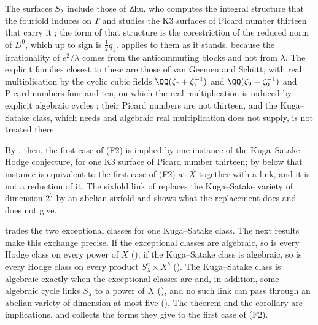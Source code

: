 \begin{remark}
The surfaces $S_{\lambda}$ include those of Zhu, who computes the integral
structure that the fourfold induces on $T$ and studies the K3 surfaces of
Picard number thirteen that carry it \cite{Zhu18}; the form of that structure
is the corestriction of the reduced norm of $D^{0}$, which up to sign is
$\frac12q_{1}$.  applies to them as it stands, because the
irrationality of $e^{2}/\lambda$ comes from the anticommuting blocks and not
from $\lambda$. The explicit families closest to these are those of van
Geemen and Sch\"utt, with
real multiplication by the cyclic cubic fields $\QQ(\zeta_{7}+\zeta_{7}^{-1})$
and $\QQ(\zeta_{9}+\zeta_{9}^{-1})$ and Picard numbers four and ten, on which
the real multiplication is induced by explicit algebraic cycles
\cite[Theorem~1.2 and Section~4.8]{vGS25}; their Picard numbers are not
thirteen, and the Kuga--Satake class, which  needs and
algebraic real multiplication does not supply, is not treated there.

By , then, the first case of (F2) is implied by one
instance of the Kuga--Satake Hodge conjecture, for one K3 surface of Picard
number thirteen; by  below that instance is
equivalent to the first case of (F2) at $X$ together with a link, and it is
not a reduction of it. The sixfold link of \cite{BB26dense} replaces the Kuga--Satake variety
of dimension $2^{7}$ by an abelian sixfold and shows what the replacement
does and does not give.
\end{remark}

 trades the two exceptional classes for one Kuga--Satake
class. The next results make this exchange precise. If the
exceptional classes are algebraic, so is every Hodge class on every power of
$X$ (); if the Kuga--Satake class is algebraic, so is
every Hodge class on every product $S_{\lambda}^{a}\times X^{b}$
(). The Kuga--Satake class is algebraic exactly
when the exceptional classes are and, in addition, some algebraic cycle links
$S_{\lambda}$ to a power of $X$ (), and no such link
can pass through an abelian variety of dimension at most five
(). The theorem and the corollary are
implications, and  collects the forms they give
to the first case of (F2).

